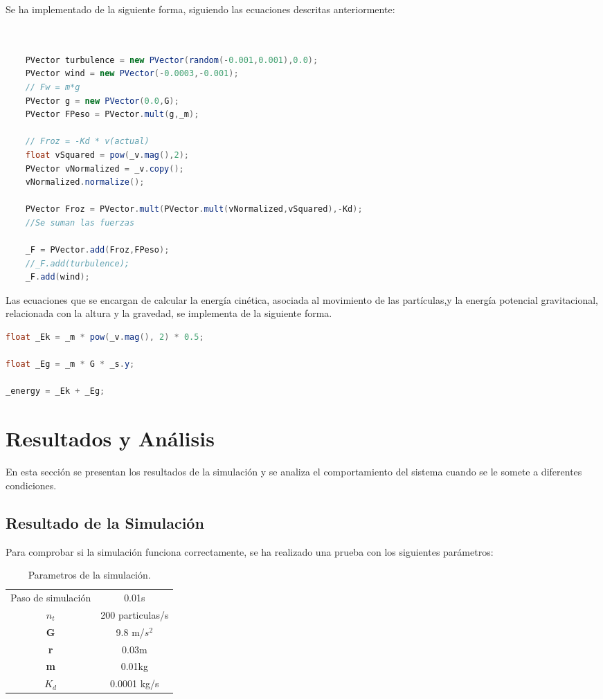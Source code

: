 \documentclass{article}
\begin{document}
Se ha implementado de la siguiente forma, siguiendo las ecuaciones descritas anteriormente:

\begin{lstlisting}[language=Java, frame=single]


    PVector turbulence = new PVector(random(-0.001,0.001),0.0);
    PVector wind = new PVector(-0.0003,-0.001);
    // Fw = m*g
    PVector g = new PVector(0.0,G);
    PVector FPeso = PVector.mult(g,_m); 
    
    // Froz = -Kd * v(actual)
    float vSquared = pow(_v.mag(),2);
    PVector vNormalized = _v.copy();
    vNormalized.normalize();
    
    PVector Froz = PVector.mult(PVector.mult(vNormalized,vSquared),-Kd);
    //Se suman las fuerzas
    
    _F = PVector.add(Froz,FPeso);
    //_F.add(turbulence);
    _F.add(wind);

\end{lstlisting}

Las ecuaciones que se encargan de calcular la energía cinética, asociada al movimiento de las partículas,y la energía potencial gravitacional, relacionada con la altura y la gravedad, se implementa de la siguiente forma.

\begin{lstlisting}[language=Java, frame=single]
float _Ek = _m * pow(_v.mag(), 2) * 0.5;

float _Eg = _m * G * _s.y;

_energy = _Ek + _Eg;
\end{lstlisting}

\section{Resultados y Análisis}

En esta sección se presentan los resultados de la simulación y se analiza el comportamiento del sistema cuando se le somete a diferentes condiciones.
\subsection{Resultado de la Simulación}

Para comprobar si la simulación funciona correctamente, se ha realizado una prueba con los siguientes parámetros:


\begin{table}[h]
    \centering
    \begin{tabular}{cc}
        Paso de simulación & 0.01s            \\
        \textbf{$n_t$}     & 200 particulas/s \\
        \textbf{G}         & 9.8 m/$s^2$      \\
        \textbf{r}         & 0.03m            \\
        \textbf{m}         & 0.01kg           \\
        \textbf{$K_d$}     & 0.0001 kg/s      \\
    \end{tabular}
    \caption{Parametros de la simulación.}
    \label{tab:parametros_1}
\end{table}
\end{document}
